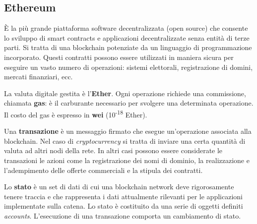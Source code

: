 \subsection{Ethereum}
È la più grande piattaforma software decentralizzata (open source) che consente lo sviluppo di smart contracts e applicazioni decentralizzate senza entità di terze parti. Si tratta di una blockchain potenziate da un linguaggio di programmazione incorporato. Questi contratti possono essere utilizzati in maniera sicura per eseguire un vasto numero di operazioni: sistemi elettorali, registrazione di domini, mercati finanziari, ecc.

La valuta digitale gestita è l'\textbf{Ether}. Ogni operazione richiede una commissione, chiamata \textbf{gas}: è il carburante necessario per svolgere una determinata operazione. Il costo del gas è espresso in \textbf{wei} (10\textsuperscript{-18} Ether).

\vspace{5mm}

Una \textbf{transazione} è un messaggio firmato che esegue un'operazione associata alla blockchain. Nel caso di \textit{cryptocurrency} si tratta di inviare una certa quantità di valuta ad altri nodi della rete. In altri casi possono essere considerate le transazioni le azioni come la registrazione dei nomi di dominio, la realizzazione e l'adempimento delle offerte commerciali e la stipula dei contratti.

\vspace{5mm}

Lo \textbf{stato} è un set di dati di cui una blockchain network deve rigorosamente tenere traccia e che rappresenta i dati attualmente rilevanti per le applicazioni implementate sulla catena. Lo stato è costituito da una serie di oggetti definiti \textit{accounts}. L'esecuzione di una transazione comporta un cambiamento di stato.


